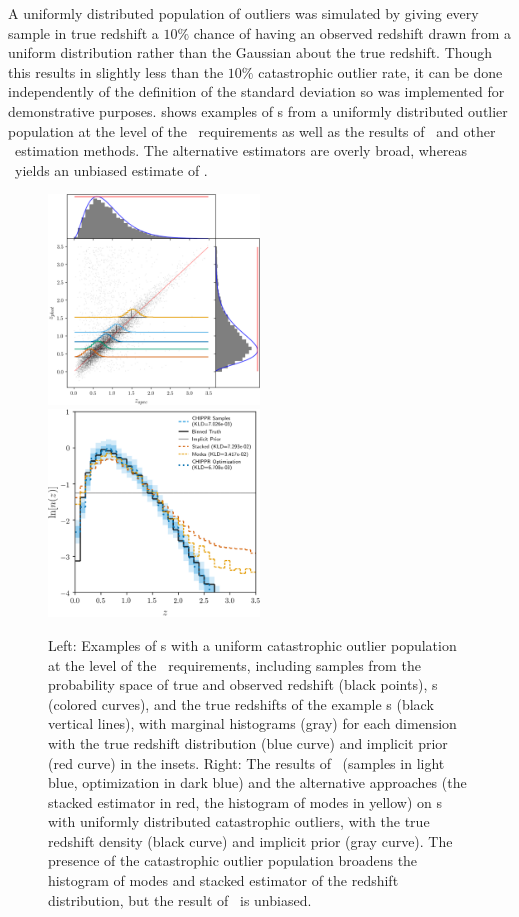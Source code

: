 A uniformly distributed population of outliers was simulated by giving every sample in true redshift a $10\%$ chance of having an observed redshift drawn from a uniform distribution rather than the Gaussian about the true redshift.
Though this results in slightly less than the $10\%$ catastrophic outlier rate, it can be done independently of the definition of the standard deviation so was implemented for demonstrative purposes.
 shows examples of \pzpdf s from a uniformly distributed outlier population at the level of the \lsst\ requirements as well as the results of \Chippr\ and other \nz\ estimation methods.
The alternative estimators are overly broad, whereas \Chippr\ yields an unbiased estimate of \nz.

\begin{figure}
	\includegraphics[width=0.5\textwidth]{figures/chippr/single_uout_mega_scatter.png}
	\includegraphics[width=0.5\textwidth]{figures/chippr/single_uout_log_estimators.png}
	\caption{
		Left: Examples of \pzpdf s with a uniform catastrophic outlier population at the level of the \lsst\ requirements, including samples from the probability space of true and observed redshift (black points), \pzpdf s (colored curves), and the true redshifts of the example \pzpdf s (black vertical lines), with marginal histograms (gray) for each dimension with the true redshift distribution (blue curve) and implicit prior (red curve) in the insets.
		Right: The results of \Chippr\ (samples in light blue, optimization in dark blue) and the alternative approaches (the stacked estimator in red, the histogram of modes in yellow) on \pzpdf s with uniformly distributed catastrophic outliers, with the true redshift density (black curve) and implicit prior (gray curve).
		The presence of the catastrophic outlier population broadens the histogram of modes and stacked estimator of the redshift distribution, but the result of \Chippr\ is unbiased.
	}
\end{figure}

